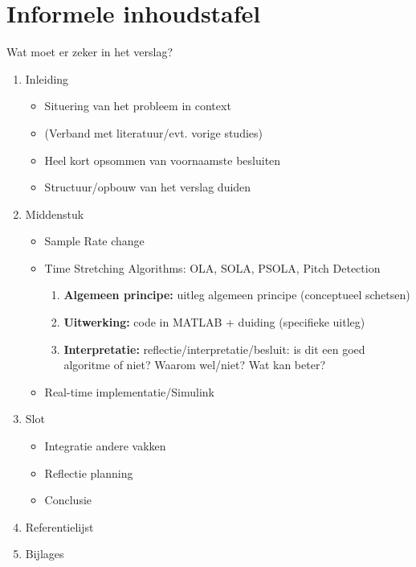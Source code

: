 \documentclass[12pt]{report}
\begin{document}
\section{Informele inhoudstafel}
Wat moet er zeker in het verslag?
\begin{enumerate}
\item Inleiding
\begin{itemize}
\item Situering van het probleem in context
\item (Verband met literatuur/evt. vorige studies)
\item Heel kort opsommen van voornaamste besluiten
\item Structuur/opbouw van het verslag duiden
\end{itemize}
\item Middenstuk
\begin{itemize}
\item Sample Rate change
\item Time Stretching Algorithms: OLA, SOLA, PSOLA, Pitch Detection
\begin{enumerate}
\item \textbf{Algemeen principe:} uitleg algemeen principe (conceptueel schetsen)
\item \textbf{Uitwerking:} code in MATLAB + duiding (specifieke uitleg)
\item \textbf{Interpretatie:} reflectie/interpretatie/besluit: is dit een goed algoritme of niet? Waarom wel/niet? Wat kan beter?
\end{enumerate}
\item Real-time implementatie/Simulink
\end{itemize}
\item Slot
\begin{itemize}
\item Integratie andere vakken
\item Reflectie planning
\item Conclusie
\end{itemize}
\item Referentielijst
\item Bijlages
\end{enumerate}
\end{document}
